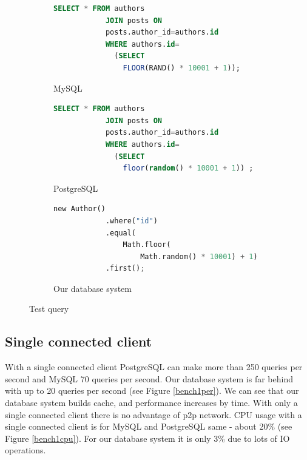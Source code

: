 \begin{figure}[h]
    \begin{subfigure}{.3\textwidth}
        \centering
        \begin{lstlisting}[language=SQL,basicstyle=\tiny]
            SELECT * FROM authors 
            JOIN posts ON 
            posts.author_id=authors.id  
            WHERE authors.id=
              (SELECT 
                FLOOR(RAND() * 10001 + 1));
        \end{lstlisting}
        \caption{MySQL}
    \end{subfigure}%
    \begin{subfigure}{.3\textwidth}
        \centering
        \begin{lstlisting}[language=SQL,basicstyle=\tiny]
            SELECT * FROM authors 
            JOIN posts ON 
            posts.author_id=authors.id  
            WHERE authors.id=
              (SELECT 
                floor(random() * 10001 + 1)) ;
        \end{lstlisting}
        \caption{PostgreSQL}
    \end{subfigure}
    \begin{subfigure}{.3\textwidth}
        \centering
        \begin{lstlisting}[language=python,basicstyle=\tiny]
            new Author()
            .where("id")
            .equal(
                Math.floor(
                    Math.random() * 10001) + 1)
            .first();
        \end{lstlisting}
        \caption{Our database system}
    \end{subfigure}
    \caption{Test query}
    \label{benchQuery}
\end{figure}


\subsection{Single connected client}
With a single connected client PostgreSQL can make more than 250 queries per second and MySQL 70 queries per second. Our database system is far behind with up to 20 queries per second (see Figure \ref{bench1per}). We can see that our database system builds cache, and performance increases by time. With only a single connected client there is no advantage of p2p network. CPU usage with a single connected client is for MySQL and PostgreSQL same - about 20\% (see Figure \ref{bench1cpu}). For our database system it is only 3\% due to lots of IO operations. 


